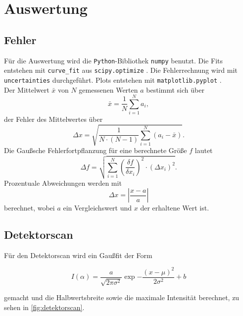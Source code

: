 \section{Auswertung}
\label{sec:Auswertung}

\subsection{Fehler}
Für die Auswertung wird die \texttt{Python}-Bibliothek \texttt{numpy} \cite{numpy} benutzt. Die Fits entstehen mit \texttt{curve\_fit} aus \texttt{scipy.optimize} \cite{scipy}.
Die Fehlerrechnung wird mit \texttt{uncertainties} \cite{uncertainties} durchgeführt. Plots entstehen mit \texttt{matplotlib.pyplot} \cite{matplotlib}. \\
Der Mittelwert $\bar{x}$ von $N$ gemessenen Werten $a$ bestimmt sich über
\begin{equation}
    \bar{x} = \frac{1}{N} \sum^N_{i=1} a_i,
    \label{eq:mittelwerte}
\end{equation}
der Fehler des Mittelwertes über
\begin{equation}
    \Delta x = \sqrt{\frac{1}{N \cdot (N-1)} \sum^N_{i=1}(a_i - \bar{x})}.
    \label{eq:mittelwerte_fehler}
\end{equation}
Die Gaußsche Fehlerfortpflanzung für eine berechnete Größe $f$ lautet
\begin{equation}
    \Delta f = \sqrt{ \sum^N_{i=1} \left( \frac{\delta f}{\delta x_i}\right)^2 \cdot (\Delta x_i)^2}.
\end{equation}
Prozentuale Abweichungen werden mit
\begin{equation}
    \Delta x = \left|\frac{x - a}{a}\right|
    \label{eq:abweichung}
\end{equation}
berechnet, wobei $a$ ein Vergleichswert und $x$ der erhaltene Wert ist.
\newpage

\subsection{Detektorscan}

Für den Detektorscan wird ein Gaußfit der Form

\begin{equation*}
    I(\alpha) = \frac{a}{\sqrt{2\pi\sigma^2}} \exp{-\frac{(x-\mu)^2}{2\sigma^2}} + b
\end{equation*}

gemacht und die Halbwertsbreite sowie die maximale Intensität berechnet, zu sehen in \autoref{fig:detektorscan}.

